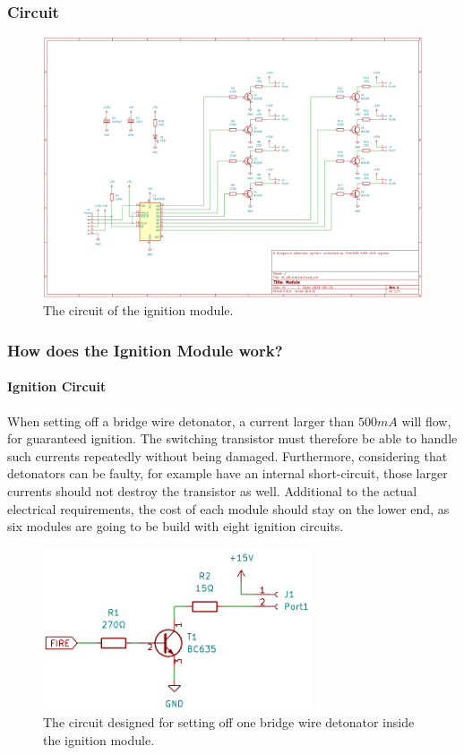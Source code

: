 \subsubsection{Circuit}

\begin{figure}[!ht]
    \centering
    \includegraphics[width=15cm]{./Figures/module_circuit.png}
    \caption{The circuit of the ignition module.}
    \label{fig:module_circuit}     
\end{figure}

\pagebreak

\subsubsection{How does the Ignition Module work?}
\label{Ignition Module work}
\paragraph{Ignition Circuit}
\noindent When setting off a bridge wire detonator, a current larger than $500mA$ will flow, for guaranteed ignition. The switching transistor must therefore be able to handle such currents repeatedly without being damaged. Furthermore, considering that detonators can be faulty, for example have an internal short-circuit, those larger currents should not destroy the transistor as well. Additional to the actual electrical requirements, the cost of each module should stay on the lower end, as six modules are going to be build with eight ignition circuits.\\

\begin{figure}[!ht]
    \centering
    \includegraphics[width=8cm]{./Figures/module_ignitor.png}
    \caption{The circuit designed for setting off one bridge wire detonator inside the ignition module.}
    \label{fig:module_ignitor}     
\end{figure}

